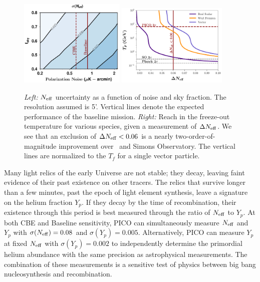 \documentclass[PICOReport.tex]{subfiles}
\begin{document}
\begin{figure}[t!]
\begin{center}
\includegraphics[width=0.45\textwidth]{images/Neff_final.pdf}
\includegraphics[width=0.47\textwidth]{images/Tf_pico.pdf}
\vspace{-0.15in}
\caption{ \captiontext
\textit{Left:} ${N_{\rm eff}}$ uncertainty as a function of noise and sky fraction. The resolution assumed is 5'.   Vertical lines denote the expected performance of the baseline mission. \textit{Right:} Reach in the freeze-out temperature for various species, given a measurement of $\Delta {N_{\rm eff}}$.  We see that an exclusion of $\Delta {N_{\rm eff}} < 0.06$ is a nearly two-order-of-magnitude improvement over \planck~and Simons Observatory.  The vertical lines are normalized to the $T_f$ for a single vector particle.
\label{fig:Neff_future}}
\end{center}
\vspace{-0.15in}
\end{figure}

Many light relics of the early Universe are not stable; they decay, leaving faint evidence of their past existence on other tracers. The relics that survive longer than a few minutes, past the epoch of light element synthesis, leave a signature on the helium fraction $Y_p$.  If they decay by the time of recombination, their existence through this period is best measured through the ratio of ${N_{\rm eff}}$ to $Y_p$. At both CBE and Baseline sensitivity, PICO can simultaneously measure ${N_{\rm eff}}$ and $Y_p$ with $\sigma({N_{\rm eff}}) = 0.08$ and $\sigma(Y_p) =0.005$.  Alternatively, PICO can measure $Y_p$ at fixed ${N_{\rm eff}}$ with $\sigma(Y_p) =0.002$ to independently determine the primordial helium abundance with the same precision as astrophysical measurements.  The combination of these measurements is a sensitive test of physics between big bang nucleosynthesis and recombination.  
\end{document}
